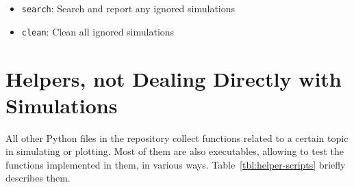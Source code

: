\begin{itemize}
	\item \texttt{search}: Search and report any ignored simulations
	\item \texttt{clean}: Clean all ignored simulations
\end{itemize}

\section{Helpers, not Dealing Directly with Simulations}

All other Python files in the repository collect functions related to a certain topic in simulating or plotting. Most of them are also executables, allowing to test the functions implemented in them, in various ways. Table~\ref{tbl:helper-scripts} briefly describes them.

